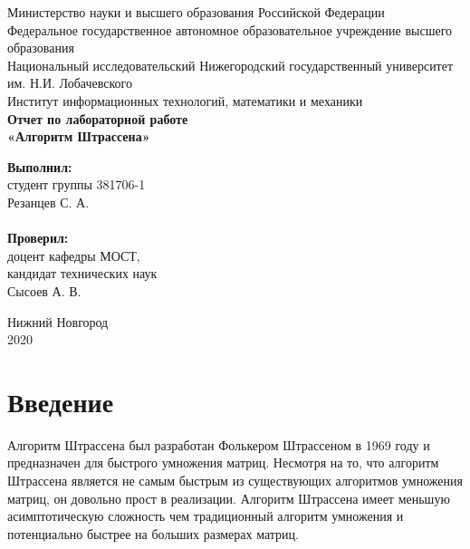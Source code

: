 \documentclass{article}
\begin{document}
\begin{titlepage}

\begin{center}
Министерство науки и высшего образования Российской Федерации \\
\vspace{5mm}
Федеральное государственное автономное образовательное учреждение высшего образования \\
Национальный исследовательский Нижегородский государственный университет им. Н.И. Лобачевского \\
\vspace{1cm}
Институт информационных технологий, математики и механики \\
\vspace{5cm}
\textbf{\large Отчет по лабораторной работе} \\
\vspace{8mm}
\textbf{\Large «Алгоритм Штрассена»} \\
\end{center}

\vspace{3cm}

\newbox{\lbox}
\newlength{\maxl}
\setlength{\maxl}{\wd\lbox}
\hfill\parbox{7cm}{
\hspace*{5cm}\hspace*{-5cm}\textbf{Выполнил:} \\ студент группы 381706-1 \\ Резанцев С. А.\\
\\
\hspace*{5cm}\hspace*{-5cm}\textbf{Проверил:}\\ доцент кафедры МОСТ, \\ кандидат технических наук \\ Сысоев А. В.
}

\vspace{\fill}

\begin{center} 
Нижний Новгород \\ 2020
\end{center}
\end{titlepage}

\setcounter{page}{2}

\tableofcontents

\newpage

\section{Введение}
Алгоритм Штрассена был разработан Фолькером Штрассеном в 1969 году и предназначен для быстрого умножения матриц. Несмотря на то, что алгоритм Штрассена является не самым быстрым из существующих алгоритмов умножения матриц, он довольно прост в реализации. Алгоритм Штрассена имеет меньшую асимптотическую сложность чем традиционный алгоритм умножения и потенциально быстрее на больших размерах матриц. 
\end{document}
